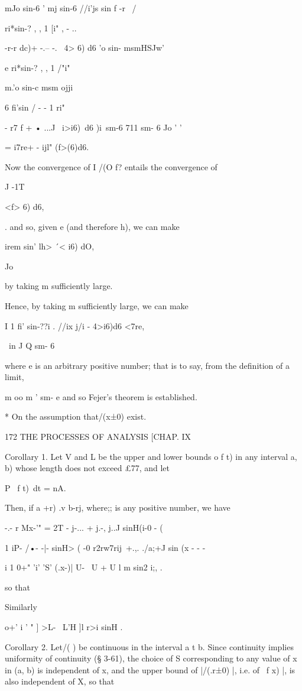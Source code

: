 mJo sin-6 ' mj sin-6 //i'js sin f -r \ /

ri*sin-? , , 1 [i" , - ..

-r-r dc)+ -.-- -. \ 4> 6) d6 'o sin- msmHSJw'

e ri*sin-? , , 1 /"i"

m.'o sin-c msm ojji

6 fi'sin / - - 1 ri"

 - r7 f + • ...J \ i>i6)\ d6 )i\ sm-6 711 sm- 6 Jo ' '

= i7re+ - ijl" (f>(6)d6.

Now the convergence of I /(O f? entails the convergence of

J -1T

<f> 6) d6,

. and so, given e (and therefore h), we can make

 irem sin' lh> \'\ < i6) dO,

Jo

by taking m sufficiently large.

Hence, by taking m sufficiently large, we can make

I 1 fi' sin-??i . //ix j/i - 4>i6)d6 <7re,

\ in J Q sm- 6

where e is an arbitrary positive number; that is to say, from the
definition of a limit,

m oo m ' sm- e and so Fejer's theorem is established.

* On the assumption that/(x±0) exist.

172 THE PROCESSES OF ANALYSIS [CHAP. IX

Corollary 1. Let V and L be the upper and lower bounds o f t) in any
interval a, b) whose length does not exceed £77, and let

P \ f t)\ dt = nA.

Then, if a +r) .v b-rj, where;; is any positive number, we have

 -.- r Mx-'" = 2T - j-... + j.-, j..J sinH(i-0 - (

  1 iP- /•- -|- sinH> ( -0 r2rw7rij\ +.,. ./a;+J sin (x - - -

i 1 0+" 'i' 'S' (.x-)| U- \ U + U l m sin2 i;, .

so that

Similarly

    o+' i ' " ] >L- \ L'H ]l r>i sinH .

Corollary 2. Let/( ) be continuous in the interval a t b. Since
continuity implies uniformity of continuity (§ 3-61), the choice of S
corresponding to any value of x in (a, b) is independent of x, and the
upper bound of |/(.r±0) |, i.e. of \ f x) |, is also independent of X,
so that

